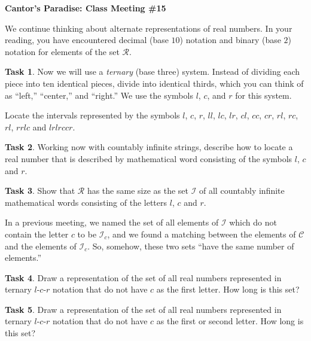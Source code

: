 \documentclass[12pt]{amsart}
\theoremstyle{definition}
\newtheorem{task}{Task}
\begin{document}
\begin{center}
\textbf{\Huge
Cantor's Paradise: Class Meeting \#15
}
\end{center}


\vspace{.5in}


We continue thinking about alternate representations of real numbers.
In your reading, you have encountered decimal (base $10$) notation and binary (base $2$) notation for elements of the set $\mathcal{R}$.

\begin{task}
Now we will use a \emph{ternary} (base three) system. Instead of dividing each piece into ten identical pieces, divide into identical thirds, which you can think of as ``left,'' ``center,'' and ``right.''
We use the symbols $l$, $c$, and $r$ for this system.

Locate the intervals represented by the symbols $l$, $c$, $r$, $ll$, $lc$, $lr$, $cl$, $cc$, $cr$, $rl$, $rc$, $rl$, $rrlc$ and $lrlrccr$.
\end{task}

\begin{task}
Working now with countably infinite strings, describe how to locate a real number that is described by mathematical word consisting of the symbols $l$, $c$ and $r$.\\
\end{task}

\begin{task}
Show that $\mathcal{R}$ has the same size as the set $\mathcal{I}$ of all countably infinite mathematical words consisting of the letters $l$, $c$ and $r$.\\
\end{task}

In a previous meeting, we named the set of all elements of $\mathcal{I}$ which do not contain the letter $c$ to be $\mathcal{I}_c$, and we found a matching between the elements of $\mathcal{C}$ and the elements of $\mathcal{I}_c$.
So, somehow, these two sets ``have the same number of elements.''\\

\begin{task}
Draw a representation of the set of all real numbers represented in ternary $l$-$c$-$r$ notation that do not have $c$ as the first letter.
How long is this set?\\
\end{task}

\begin{task}
Draw a representation of the set of all real numbers represented in ternary $l$-$c$-$r$ notation that do not have $c$ as the first or second letter. How long is this set? \\
\end{task}
\end{document}
